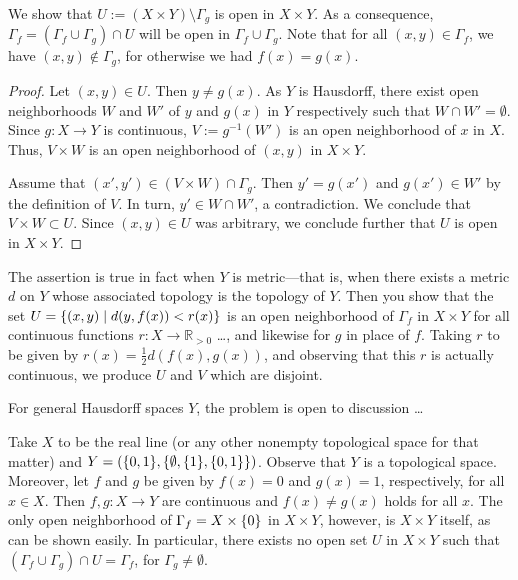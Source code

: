 \documentclass[a4paper]{amsart}
\newcommand{\R}{\mathbb{R}}
\theoremstyle{remark}
\numberwithin{equation}{question}
\DeclarePairedDelimiter\set{\{}{\}}
\begin{document}
\begin{solution}%
\begin{solenum}
\item We show that $U := (X \times Y) \setminus \Gamma_g$ is open in $X \times Y$. As a consequence, $\Gamma_f = (\Gamma_f \cup \Gamma_g) \cap U$ will be open in $\Gamma_f \cup \Gamma_g$. Note that for all $(x,y) \in \Gamma_f$, we have $(x,y) \notin \Gamma_g$, for otherwise we had $f(x) = g(x)$.

\begin{proof}
Let $(x,y) \in U$. Then $y \ne g(x)$. As $Y$ is Hausdorff, there exist open neighborhoods $W$ and $W'$ of $y$ and $g(x)$ in $Y$ respectively such that $W \cap W' = \emptyset$. Since $g \colon X \to Y$ is continuous, $V := g^{-1}(W')$ is an open neighborhood of $x$ in $X$. Thus, $V \times W$ is an open neighborhood of $(x,y)$ in $X \times Y$.

Assume that $(x',y') \in (V \times W) \cap \Gamma_g$. Then $y' = g(x')$ and $g(x') \in W'$ by the definition of $V$. In turn, $y' \in W \cap W'$, a contradiction. We conclude that $V \times W \subset U$. Since $(x,y) \in U$ was arbitrary, we conclude further that $U$ is open in $X \times Y$.
\end{proof}

\item The assertion is true in fact when $Y$ is metric---that is, when there exists a metric $d$ on $Y$ whose associated topology is the topology of $Y$. Then you show that the set $U = \set{(x,y) \mid d(y,f(x)) < r(x)}$ is an open neighborhood of $\Gamma_f$ in $X \times Y$ for all continuous functions $r \colon X \to \R_{>0}$ \ldots, and likewise for $g$ in place of $f$. Taking $r$ to be given by $r(x) = \frac12 d(f(x),g(x))$, and observing that this $r$ is actually continuous, we produce $U$ and $V$ which are disjoint.

For general Hausdorff spaces $Y$, the problem is open to discussion \ldots

\item Take $X$ to be the real line (or any other nonempty topological space for that matter) and $Y = (\set{0,1},\set{\emptyset,\set1,\set{0,1}})$. Observe that $Y$ is a topological space. Moreover, let $f$ and $g$ be given by $f(x) = 0$ and $g(x) = 1$, respectively, for all $x \in X$. Then $f,g \colon X \to Y$ are continuous and $f(x) \ne g(x)$ holds for all $x$. The only open neighborhood of $\Gamma_f = X \times \set0$ in $X \times Y$, however, is $X \times Y$ itself, as can be shown easily. In particular, there exists no open set $U$ in $X \times Y$ such that $(\Gamma_f \cup \Gamma_g) \cap U = \Gamma_f$, for $\Gamma_g \ne \emptyset$.
\end{solenum}
\end{solution}
\end{document}
